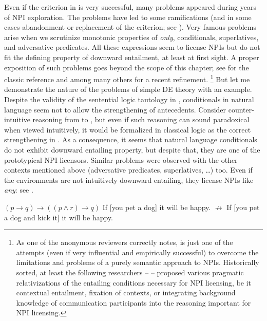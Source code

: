 \documentclass[output=paper,colorlinks,citecolor=brown]{langscibook}
\begin{document}
Even if the criterion in  is very successful, many problems appeared during years of NPI exploration. The problems have led to some ramifications (and in some cases abandonment or replacement of the criterion; see \citealt{giannakidou1997landscape,linebarger1987negative}). Very famous problems arise when we scrutinize monotonic properties of \emph{only}, conditionals, superlatives, and adversative predicates. All these expressions seem to license NPIs but do not fit the defining property of downward entailment, at least at first sight. A proper exposition of such problems goes beyond the scope of this chapter; see \citet{von1999npi} for the classic reference and \citet{gajewski2011licensing} among many others for a recent refinement.%
\footnote{As one of the anonymous reviewers correctly notes, \citet{von1999npi} is just one of the attempts (even if very influential and empirically successful) to overcome the limitations and problems of a purely semantic approach to NPIs. Historically sorted, at least the following researchers -- \citet{heim1984note,kadmon1993any,israel_polarity_1996} -- proposed various pragmatic relativizations of the entailing conditions necessary for NPI licensing, be it contextual entailment, fixation of contexts, or integrating background knowledge of communication participants into the reasoning important for NPI licensing.}
But let me demonstrate the nature of the problems of simple DE theory with an example. Despite the validity of the sentential logic tautology in , conditionals in natural language seem not to allow the strengthening of antecedents. Consider counter-intuitive reasoning from  to , but even if such reasoning can sound paradoxical when viewed intuitively, it would be formalized in classical logic as the correct strengthening in . As a consequence, it seems that natural language conditionals do not exhibit downward entailing property, but despite that, they are one of the prototypical NPI licensors. Similar problems were observed with the other contexts mentioned above (adversative predicates, superlatives, \ldots) too. Even if the environments are not intuitively downward entailing, they license NPIs like \emph{any}: see .

\ea\label{ex:15}\ea\label{ex:15-a} $(p \rightarrow q) \rightarrow ((p \wedge r) \rightarrow q)$
\ex\label{ex:15-b} If [you pet a dog] it will be happy. $\not\rightarrow$
\ex\label{ex:15-c} If [you pet a dog and kick it] it will be happy.
\z
\z
\end{document}
